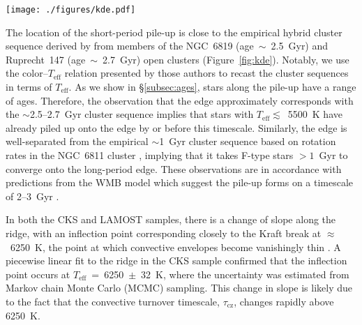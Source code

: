 \documentclass[linenumbers,tighten,trackchanges,twocolumn]{aastex631}
\newcommand{\taucz}{$\tau_\mathrm{cz}$\xspace}
\newcommand{\lamostmcq}{LAMOST--McQuillan\xspace}
\newcommand{\teffmin}{5500~K\xspace}
\newcommand{\teff}{\ensuremath{T_{\mathrm{eff}}}\xspace}
\newcommand{\prot}{\ensuremath{P_\mathrm{rot}}\xspace}
\begin{document}
\begin{figure*}
    \centering
    \texttt{[image: ./figures/kde.pdf]}
    \caption{Gaussian kernel density estimation (blue contours) of the \teff--\prot distributions of the CKS--McQuillan, \lamostmcq, and asteroseismic \citet{Hall2021} samples, from left to right. Empirical cluster sequences from \citet{Curtis2020} are shown by the dark grey lines. The orange dashed lines show constant Rossby curves of fiducial values (see \S\ref{subsec:rossby}). The short-period pile-up can be observed in the LAMOST--McQuillan sample for \teff~$\gtrsim$~5500~K. The orange point indicates the Sun's temperature and equatorial rotation period, with the errorbar capturing the range of periods measured from its differentially rotating surface.}
    \label{fig:kde}
\end{figure*}

The location of the short-period pile-up is close to the empirical hybrid cluster sequence derived by \citet{Curtis2020} from members of the NGC~6819 (age~$\sim$~2.5~Gyr) and Ruprecht~147 (age~$\sim$~2.7~Gyr) open clusters (Figure~\ref{fig:kde}). Notably, we use the color--\teff relation presented by those authors to recast the cluster sequences in terms of \teff. As we show in \S\ref{subsec:ages}, stars along the pile-up have a range of ages. Therefore, the observation that the edge approximately corresponds with the $\sim$2.5--2.7~Gyr cluster sequence implies that stars with \teff$\lesssim$~\teffmin have already piled up onto the edge by or before this timescale. Similarly, the edge is well-separated from the empirical $\sim$1~Gyr cluster sequence based on rotation rates in the NGC~6811 cluster \citep{Curtis2020}, implying that it takes F-type stars $>1$~Gyr to converge onto the long-period edge. These observations are in accordance with predictions from the WMB model which suggest the pile-up forms on a timescale of 2--3~Gyr \citep{vanSaders2019}.

In both the CKS and LAMOST samples, there is a change of slope along the ridge, with an inflection point corresponding closely to the Kraft break at $\approx$~6250~K, the point at which convective envelopes become vanishingly thin \citep{Kraft1967}. A piecewise linear fit to the ridge in the CKS sample confirmed that the inflection point occurs at \teff~=~6250~$\pm$~32~K, where the uncertainty was estimated from Markov chain Monte Carlo (MCMC) sampling. This change in slope is likely due to the fact that the convective turnover timescale, \taucz, changes rapidly above 6250~K.
\end{document}

